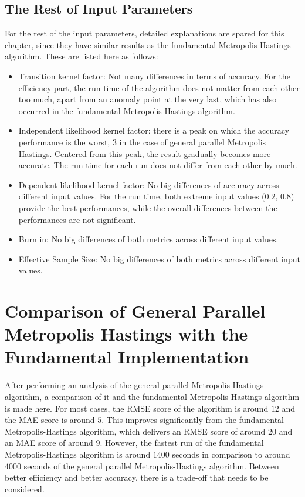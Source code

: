 \subsection{The Rest of Input Parameters}
For the rest of the input parameters, detailed explanations are spared for this chapter, since they have similar results as the fundamental Metropolis-Hastings algorithm. These are listed here as follows: 
\begin{itemize}
    \item Transition kernel factor: Not many differences in terms of accuracy. For the efficiency part, the run time of the algorithm does not matter from each other too much, apart from an anomaly point at the very last, which has also occurred in the fundamental Metropolis Hastings algorithm.
    \item Independent likelihood kernel factor: there is a peak on which the accuracy performance is the worst, $3$ in the case of general parallel Metropolis Hastings. Centered from this peak, the result gradually becomes more accurate. The run time for each run does not differ from each other by much.
    \item Dependent likelihood kernel factor: No big differences of accuracy across different input values. For the run time, both extreme input values ($0.2$, $0.8$) provide the best performances, while the overall differences between the performances are not significant.
    \item Burn in: No big differences of both metrics across different input values.
    \item Effective Sample Size: No big differences of both metrics across different input values.
\end{itemize}

\section{Comparison of General Parallel Metropolis Hastings with the Fundamental Implementation}
After performing an analysis of the general parallel Metropolis-Hastings algorithm, a comparison of it and the fundamental Metropolis-Hastings algorithm is made here. For most cases, the RMSE score of the algorithm is around $12$ and the MAE score is around $5$. This improves significantly from the fundamental Metropolis-Hastings algorithm, which delivers an RMSE score of around $20$ and an MAE score of around $9$. However, the fastest run of the fundamental Metropolis-Hastings algorithm is around $1400$ seconds in comparison to around $4000$ seconds of the general parallel Metropolis-Hastings algorithm. Between better efficiency and better accuracy, there is a trade-off that needs to be considered.